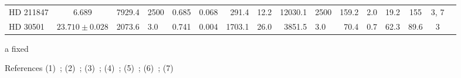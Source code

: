 \begin{table*}
\begin{threeparttable}[b]
\begin{tabular}{l c r@{$ \,\pm\, $}l r@{$ \,\pm\, $}l r@{$ \,\pm\, $}l r@{$ \,\pm\, $}l r@{$ \,\pm\, $}l cc c c}
        {HD 211847} 	 & 6.689\tnote{a} & 7929.4 & 2500  		    	 & 0.685 & 0.068   	  & 291.4   & 12.2   & 12030.1    & 2500   & 159.2 		& 2.0     & 19.2  & 155  				& 3, 7\\
        {HD 30501}  	  & $23.710\pm0.028$         & 2073.6 & 3.0 				& 0.741 & 0.004   	   & 1703.1 & 26.0   & 3851.5 		& 3.0     & 70.4 		& 0.7     & 62.3   & 89.6      			& 3  \\
        \bottomrule
    \end{tabular}
    \begin{tablenotes}

         \item [a]{fixed}
        \item[References] (1)~\citet{crepp_trends_2016}; (2)~\citet{udry_coralie_2002}; (3)~\citet{sahlmann_search_2011};   (4)~\citet{pilyavsky_search_2011}; (5)~\citet{correia_coralie_2005};  (6)~\citet{benedict_hd_2017}; (7)~\citet{moutou_eccentricity_2017}

 
    \end{tablenotes}
    \end{threeparttable}
    \label{tab:orbitparams}
\end{table*}
